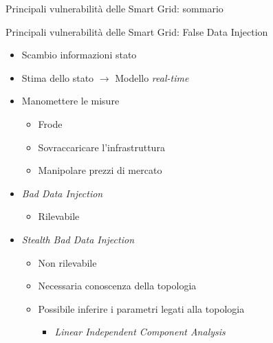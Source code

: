 \begin{frame}{Principali vulnerabilità delle Smart Grid: sommario}
\end{frame}

\begin{frame}{Principali vulnerabilità delle Smart Grid: False Data Injection}
	\begin{itemize}[<+- | alert@+>]
		\item Scambio informazioni stato
		\item Stima dello stato $\rightarrow$ Modello \textit{real-time}
		\item Manomettere le misure
		\begin{itemize}
			\item Frode
			\item Sovraccaricare l'infrastruttura
			\item Manipolare prezzi di mercato
		\end{itemize}
		\item \textit{Bad Data Injection}
		\begin{itemize}
			\item Rilevabile
		\end{itemize}
		\item \textit{Stealth Bad Data Injection}
		\begin{itemize}
			\item Non rilevabile
			\item Necessaria conoscenza della topologia
			\item Possibile inferire i parametri legati alla topologia
			\begin{itemize}
				\item \textit{Linear Independent Component Analysis}
			\end{itemize}
		\end{itemize}
	\end{itemize}
\end{frame}
